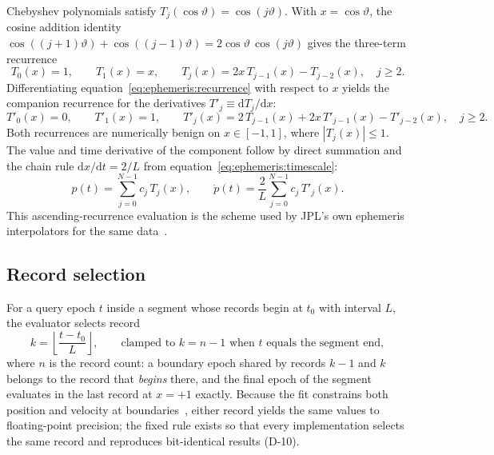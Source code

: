Chebyshev polynomials satisfy $T_j(\cos\vartheta) = \cos(j\vartheta)$. With
$x = \cos\vartheta$, the cosine addition identity
$\cos((j{+}1)\vartheta) + \cos((j{-}1)\vartheta)
 = 2\cos\vartheta\,\cos(j\vartheta)$
gives the three-term recurrence
\begin{equation}
  T_0(x) = 1,
  \qquad
  T_1(x) = x,
  \qquad
  T_{j}(x) = 2x\,T_{j-1}(x) - T_{j-2}(x),
  \quad j \ge 2.
  \label{eq:ephemeris:recurrence}
\end{equation}
Differentiating equation~\eqref{eq:ephemeris:recurrence} with respect to $x$
yields the companion recurrence for the derivatives
$T'_j \equiv \mathrm{d}T_j/\mathrm{d}x$:
\begin{equation}
  T'_0(x) = 0,
  \qquad
  T'_1(x) = 1,
  \qquad
  T'_{j}(x) = 2\,T_{j-1}(x) + 2x\,T'_{j-1}(x) - T'_{j-2}(x),
  \quad j \ge 2.
  \label{eq:ephemeris:derivrecurrence}
\end{equation}
Both recurrences are numerically benign on $x \in [-1,1]$, where
$|T_j(x)| \le 1$. The value and time derivative of the component follow by
direct summation and the chain rule
$\mathrm{d}x/\mathrm{d}t = 2/L$ from equation~\eqref{eq:ephemeris:timescale}:
\begin{equation}
  \boxed{\;
  p(t) = \sum_{j=0}^{N-1} c_j\, T_j(x),
  \qquad
  \dot{p}(t) = \frac{2}{L} \sum_{j=0}^{N-1} c_j\, T'_j(x).
  \;}
  \label{eq:ephemeris:series}
\end{equation}
This ascending-recurrence evaluation is the scheme used by JPL's own
ephemeris interpolators for the same data~\cite{newhall1989}.

\subsection{Record selection}

For a query epoch $t$ inside a segment whose records begin at $t_0$ with
interval $L$, the evaluator selects record
\begin{equation}
  k = \left\lfloor \frac{t - t_0}{L} \right\rfloor,
  \qquad
  \text{clamped to } k = n - 1 \text{ when } t \text{ equals the segment end},
  \label{eq:ephemeris:selection}
\end{equation}
where $n$ is the record count: a boundary epoch shared by records $k-1$ and
$k$ belongs to the record that \emph{begins} there, and the final epoch of
the segment evaluates in the last record at $x = +1$ exactly. Because the
fit constrains both position and velocity at boundaries~\cite{newhall1989},
either record yields the same values to floating-point precision; the fixed
rule exists so that every implementation selects the same record and
reproduces bit-identical results (D-10).


